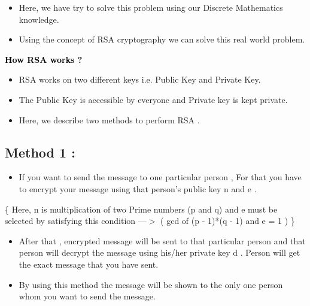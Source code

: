 \documentclass{article}
\begin{document}
\begin{itemize}
\item Here, we have try to solve this problem using our Discrete Mathematics knowledge.
\item Using the concept of RSA cryptography we can solve this real world problem.\\
\end{itemize}


{\LARGE \bf \textcolor{black}{How RSA works ?}\\}


\begin{itemize}
\item RSA works on two different keys i.e. Public Key and Private Key. 
\item The Public Key is accessible by everyone and Private key is kept private. 
\item Here, we describe two methods to perform RSA .   \\
\end{itemize}

\subsection{ Method 1 :  \\}

\begin{itemize}
\item If you want to send the message to one particular person , For that you have to encrypt your message using that person's public key n and e .
\end{itemize}

 \{ 
	Here, n is multiplication of two Prime numbers (p and q)  and e must 	be\\        selected by satisfying this condition ---\(>\) 
	( gcd of (p - 1)*(q - 1) and e  = 1 ) 
\}
\begin{itemize}
\item After that , encrypted message will be sent to that particular person and that person will decrypt the message using his/her private key d . Person will get the exact message that you have sent.
\end{itemize}

\begin{itemize}
\item By using this method the message will be shown to the only one person whom you want to send the message.
\end{itemize}
\end{document}
